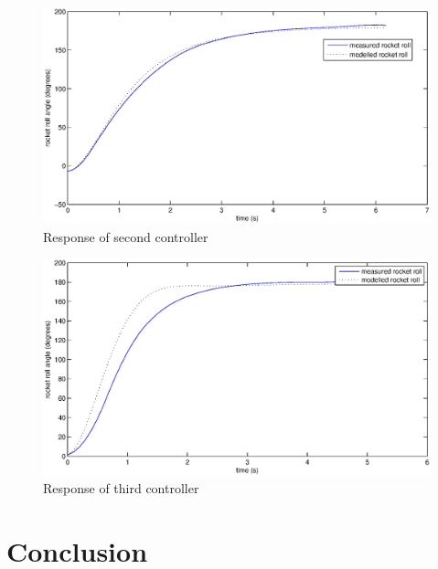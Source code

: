 \documentclass[a4paper,12pt]{article}
\begin{document}
    \begin{figure}
      \centering
      \includegraphics[width=\textwidth]{two}
      \caption{Response of second controller}
      \label{fig:two}
    \end{figure}

    \begin{figure}
      \centering
      \includegraphics[width=\textwidth]{three}
      \caption{Response of third controller}
      \label{fig:three}
    \end{figure}

  \section{Conclusion}
\end{document}
